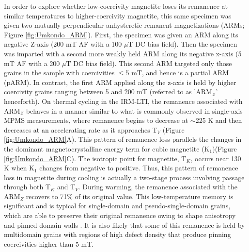 \documentclass[draft,gc]{AGUTeX}
\begin{document}
\begin{article}
In order to explore whether low-coercivity magnetite loses its remanence at similar temperatures to higher-coercivity magnetite, this same specimen was given two mutually perpendicular anhysteretic remanent magnetizations (ARMs; Figure \ref{fig:Umkondo_ARM}). First, the specimen was given an ARM along its negative Z-axis (200 mT AF with a 100 $\mu$T DC bias field).  Then the specimen was imparted with a second more weakly held ARM along its negative x-axis (5 mT AF with a 200 $\mu$T DC bias field).  This second ARM targeted only those grains in the sample with coercivities $\leq$5 mT, and hence is a partial ARM (pARM). In contrast, the first ARM applied along the z-axis is held by higher coercivity grains ranging between 5 and 200 mT (referred to as 'ARM$_{Z}$' henceforth). On thermal cycling in the IRM-LTI, the remanence associated with ARM$_{Z}$ behaves in a manner similar to what is commonly observed in single-axis MPMS measurements, where remanence begins to decrease at $\sim$225 K and then decreases at an accelerating rate as it approaches T$_{V}$ (Figure \ref{fig:Umkondo_ARM}A). This pattern of remanence loss parallels the changes in the dominant magnetocrystalline energy term for cubic magnetite (K$_{1}$)(Figure \ref{fig:Umkondo_ARM}C). The isotropic point for magnetite, T$_{K}$, occurs near 130 K when K$_{1}$ changes from negative to positive. Thus, this pattern of remanence loss in magnetite during cooling is actually a two-stage process involving passage through both T$_{K}$ and T$_{V}$. During warming, the remanence associated with the ARM$_{Z}$ recovers to 71\% of its original value. This low-temperature memory is significant and is typical for single-domain and pseudo-single-domain grains, which are able to preserve their original remanence owing to shape anisotropy and pinned domain walls \citep{Dunlop1997a}. It is also likely that some of this remanence is held by multidomain grains with regions of high defect density that produce pinning coercivities higher than 5 mT.


\end{article}
\end{document}
